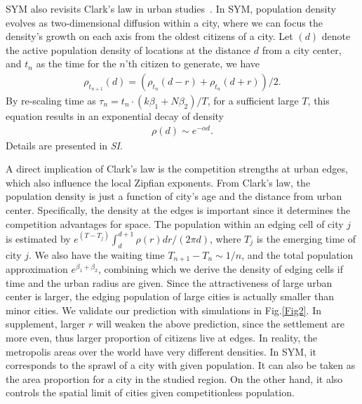 \documentclass[reprint,unsortedaddress,amsmath,amssymb,aps,prl,showkeys]{revtex4-2}
\begin{document}
SYM also revisits Clark's law in urban studies~\cite{clark1951urban}. In SYM, population density evolves as two-dimensional diffusion within a city\cite{doi:10.1137/0150099}, where we can focus the density's growth on each axis from the oldest citizens of a city. Let $
(d)$ denote the active population density of locations at the distance $d$ from a city center, and $t_n$ as the time for the $n$'th citizen to generate, we have 
\begin{align}
	\rho_{t_{n+1}}(d) = (\rho_{t_{n}}(d-r) + \rho_{t_{n}}(d+r) )/2.\label{loc_den}  
\end{align} By re-scaling time as $\tau_n = t_n\cdot (k\beta_1+N\beta_2)/T$, for a sufficient large $T$, this equation results in an exponential decay of density
\begin{align}
	\rho(d)\sim e^{-\alpha d}\label{clark_eq}.
\end{align} Details are presented in \textit{SI}. 

A direct implication of Clark's law is the competition strengths at urban edges, which also influence the local Zipfian exponents. From Clark's law, the population density is just a function of city's age and the distance from urban center. Specifically, the density at the edges is important since it determines the competition advantages for space. The population within an edging cell of city $j$ is estimated by $e^{(T-T_j)}\int_{d}^{d+1}\rho(r)dr/(2\pi d)$, where $T_j$ is the emerging time of city $j$. We also have the waiting time $T_{n+1}-T_{n}\sim 1/n$, and the total population approximation $e^{\beta_1+\beta_2}$, combining which we derive the density of edging cells if time and the urban radius are given. Since the attractiveness of large urban center is larger, the edging population of large cities is actually smaller than minor cities. We validate our prediction with simulations in Fig.\@\ref{Fig2}. %
In supplement, larger $r$ will weaken the above prediction, since the settlement are more even, thus larger proportion of citizens live at edges. In reality, the metropolis areas over the world have very different densities. In SYM, it corresponds to the sprawl of a city with given population. It can also be taken as the area proportion for a city in the studied region. On the other hand, it also controls the spatial limit of cities given competitionless population.
\end{document}
